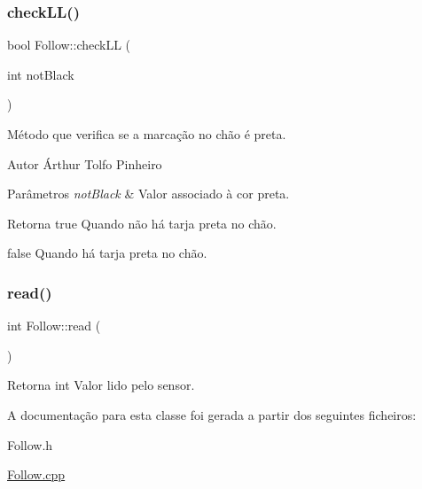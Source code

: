 \subsubsection{\texorpdfstring{check\+L\+L()}{checkLL()}}
{\footnotesize\ttfamily bool Follow\+::check\+LL (\begin{DoxyParamCaption}\item[{int}]{not\+Black }\end{DoxyParamCaption})}



Método que verifica se a marcação no chão é preta. 

\begin{DoxyAuthor}{Autor}
Árthur Tolfo Pinheiro 
\end{DoxyAuthor}

\begin{DoxyParams}{Parâmetros}
{\em not\+Black} & Valor associado à cor preta. \\
\hline
\end{DoxyParams}
\begin{DoxyReturn}{Retorna}
true Quando não há tarja preta no chão. 

false Quando há tarja preta no chão. 
\end{DoxyReturn}
\mbox{\label{class_follow_a819180a10759319966d6d81565698fb8}} 
\subsubsection{\texorpdfstring{read()}{read()}}
{\footnotesize\ttfamily int Follow\+::read (\begin{DoxyParamCaption}{ }\end{DoxyParamCaption})}

\begin{DoxyReturn}{Retorna}
int Valor lido pelo sensor. 
\end{DoxyReturn}


A documentação para esta classe foi gerada a partir dos seguintes ficheiros\+:\begin{DoxyCompactItemize}
\item 
Follow.\+h\item 
\mbox{\hyperlink{_follow_8cpp}{Follow.\+cpp}}\end{DoxyCompactItemize}
